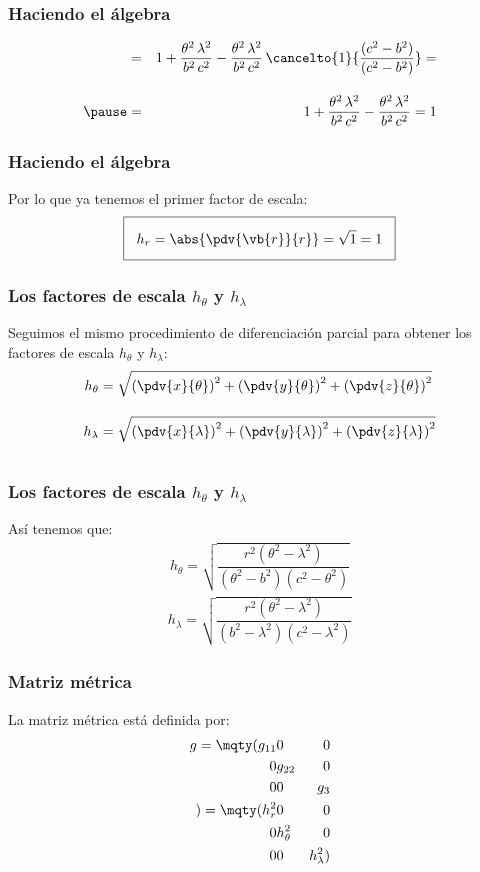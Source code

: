 \begin{frame}
\frametitle{Haciendo el álgebra}
\begin{eqnarray*}
&=& 1 + \dfrac{\theta^{2} \, \lambda^{2}}{b^{2} \, c^{2}} - \dfrac{\theta^{2} \, \lambda^{2}}{b^{2} \, c^{2}} \, \cancelto{1}{\dfrac{(c^{2} - b^{2})}{(c^{2} - b^{2})}} = \\[1em] \pause
&=& 1 + \dfrac{\theta^{2} \, \lambda^{2}}{b^{2} \, c^{2}} - \dfrac{\theta^{2} \, \lambda^{2}}{b^{2} \, c^{2}} =  1
\end{eqnarray*}
\end{frame}
\begin{frame}
\frametitle{Haciendo el álgebra}
Por lo que ya tenemos el primer factor de escala:
\begin{align*}
\setlength{\fboxsep}{3\fboxsep}\boxed{h_{r} = \abs{\pdv{\vb{r}}{r}} = \sqrt{1} = 1}
\end{align*}
\end{frame}
\begin{frame}
\frametitle{Los factores de escala $h_{\theta}$ y $h_{\lambda}$}
Seguimos el mismo procedimiento de diferenciación parcial para obtener los factores de escala $h_{\theta}$ y $h_{\lambda}$:
\begin{align*}
h_{\theta} &= \sqrt{\left( \pdv{x}{\theta} \right)^{2} + \left( \pdv{y}{\theta} \right)^{2} + \left( \pdv{z}{\theta} \right)^{2}} \\[1em]
h_{\lambda} &= \sqrt{\left( \pdv{x}{\lambda} \right)^{2} + \left( \pdv{y}{\lambda} \right)^{2} + \left( \pdv{z}{\lambda} \right)^{2}} \\[1em]
\end{align*}
\end{frame}
\begin{frame}
\frametitle{Los factores de escala $h_{\theta}$ y $h_{\lambda}$}
Así tenemos que:
\begin{align*}
h_{\theta} = \sqrt{\dfrac{r^{2} (\theta^{2} - \lambda^{2})}{(\theta^{2} - b^{2})(c^{2} - \theta^{2})}}
\end{align*}
\pause
\begin{align*}
h_{\lambda} = \sqrt{\dfrac{r^{2} (\theta^{2} - \lambda^{2})}{(b^{2} - \lambda^{2})(c^{2} - \lambda^{2})}}
\end{align*}
\end{frame}
\begin{frame}
\frametitle{Matriz métrica}
La matriz métrica está definida por:
\begin{align*}
g = \mqty(
g_{11} & 0 & 0 \\
0 & g_{22} & 0 \\
0 & 0 & g_{3} \\
) = 
\mqty(
h_{r}^{2} & 0 & 0 \\
0 & h_{\theta}^{2} & 0 \\
0 & 0 & h_{\lambda}^{2}
)
\end{align*}
\end{frame}

